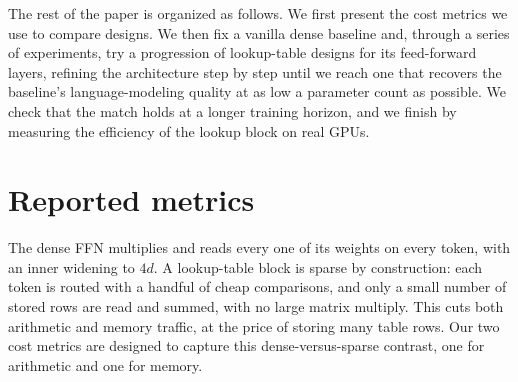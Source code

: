 \documentclass[11pt]{article}
\begin{document}
The rest of the paper is organized as follows. We first present the cost metrics we use to compare
designs. We then fix a vanilla dense baseline and, through a
series of experiments, try a progression of lookup-table designs for its feed-forward layers,
refining the architecture step by step until we reach one that recovers the baseline's
language-modeling quality at as low a parameter count as possible. We check that the match holds at a longer training horizon, and we finish by measuring the
efficiency of the lookup block on real GPUs.

\section{Reported metrics}

The dense FFN multiplies and reads every one of its weights on every token, with an inner widening
to $4d$. A lookup-table block is sparse by construction: each token is routed with a handful of
cheap comparisons, and only a small number of stored rows are read and summed, with no large matrix
multiply. This cuts both arithmetic and memory traffic, at the price of storing many table rows.
Our two cost metrics are designed to capture this dense-versus-sparse contrast, one for arithmetic
and one for memory.
\end{document}
